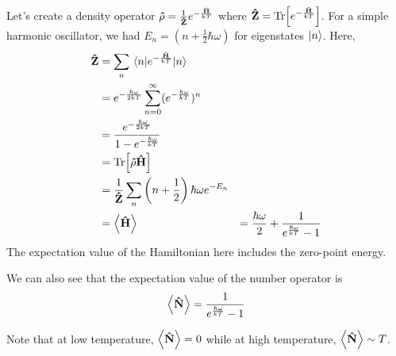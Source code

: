 \documentclass[a4paper,twoside,master.tex]{subfiles}
\begin{document}
Let's create a density operator $ \vu{\rho} = \frac{1}{\vu{Z}} e^{- \frac{\vu{H}}{kT}} $ where $ \vu{Z} = \Tr[e^{- \frac{\vu{H}}{kT}}] $. For a simple harmonic oscillator, we had $ E_n = \left( n + \frac{1}{2} \hbar \omega \right) $ for eigenstates $ \ket{n} $. Here,
\begin{align}
    \vu{Z} &= \sum_n \ev{e^{- \frac{\vu{H}}{kT}}}{n} \\
    &= e^{- \frac{\hbar \omega}{2kT}} \sum_{n=0}^{\infty} (e^{- \frac{\hbar \omega}{kT}})^{n} \\
    &= \frac{e^{- \frac{\hbar \omega}{2kT}}}{1 - e^{- \frac{\hbar \omega}{kT}}} \\
    &= \Tr[ \vu{\rho} \vu{H}] \\
    &= \frac{1}{ \vu{Z}} \sum_n \left( n + \frac{1}{2} \right) \hbar \omega e^{-E_n} \\
    &= \ev{ \vu{H}}
    &= \frac{\hbar \omega}{2} + \frac{1}{e^{\frac{\hbar \omega}{kT}} - 1}
\end{align}
The expectation value of the Hamiltonian here includes the zero-point energy.

We can also see that the expectation value of the number operator is
\begin{equation}
    \ev{ \vu{N}} = \frac{1}{e^{\frac{\hbar \omega}{kT}} - 1}
\end{equation}

Note that at low temperature, $ \ev{ \vu{N}} = 0 $ while at high temperature, $ \ev{ \vu{N}} \sim T $.
\end{document}
